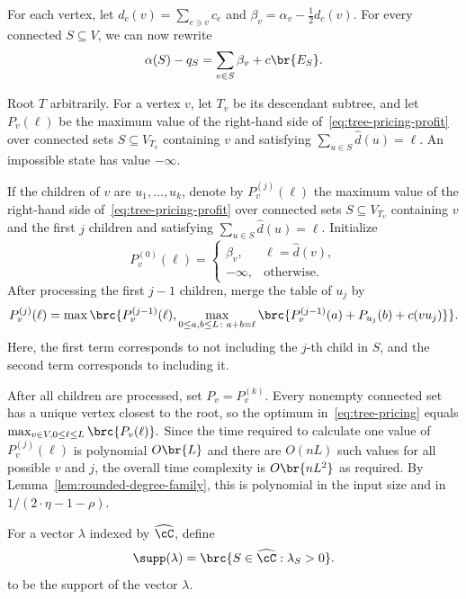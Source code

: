 For each vertex, let $d_c(v)=\sum_{e\ni v}c_e$ and $\beta_v=\alpha_v-\frac{1}{2}d_c(v).$
For every connected $S\subseteq V$, we can now rewrite
\begin{equation}\label{eq:tree-pricing-profit}
    \alpha(S)-q_S
    =\sum_{v\in S}\beta_v+c\br{E_S}.
\end{equation}

Root $T$ arbitrarily. For a vertex $v$, let $T_v$ be its descendant subtree, and let $P_v(\ell)$ be the maximum value of the right-hand side of~\eqref{eq:tree-pricing-profit} over connected sets $S\subseteq V_{T_v}$ containing $v$ and satisfying $\sum_{u\in S}\widehat d(u)=\ell$. An impossible state has value $-\infty$.

If the children of $v$ are $u_1,\ldots,u_k$, denote by
$P_v^{(j)}(\ell)$ the maximum value of the right-hand side of~\eqref{eq:tree-pricing-profit} over connected sets $S\subseteq V_{T_v}$ containing $v$ and the first $j$ children and satisfying $\sum_{u\in S}\widehat d(u)=\ell$.
Initialize
\[
    P_v^{(0)}(\ell)
    =\begin{cases}
        \beta_v,&\ell=\widehat d(v),\\
        -\infty,&\text{otherwise}.
    \end{cases}
\]
After processing the first $j-1$ children, merge the table of $u_j$ by
\begin{align*}
    P_v^{(j)}(\ell)
    =\max\brc{
        P_v^{(j-1)}(\ell),
        \max_{0\leq a,b\leq L\colon a+b=\ell}
        \brc{P_v^{(j-1)}(a)+P_{u_j}(b)+c(vu_j)}
    }.
\end{align*}
Here, the first term corresponds to not including the $j$-th child in $S$, and the second term corresponds to including it.

After all children are processed, set $P_v=P_v^{(k)}$. Every nonempty connected set has a unique vertex closest to the root, so the optimum in~\eqref{eq:tree-pricing} equals $
    \max_{v\in V, 0\leq\ell\leq L}\brc{P_v(\ell)}.$ 
Since the time required to calculate one value of $P_v^{(j)}(\ell)$ is polynomial $O\br{L}$ and there are $O(nL)$ such values for all possible $v$ and $j$, the overall time complexity is $O\br{nL^2}$ as required.
By Lemma~\ref{lem:rounded-degree-family}, this is polynomial in the input size and in $1/(2\cdot\eta-1-\rho)$.

For a vector $\lambda$ indexed by $\widehat\cC$, define
\[
    \supp(\lambda)=\brc{S\in\widehat\cC:\lambda_S>0}.
\]
to be the support of the vector $\lambda$.

